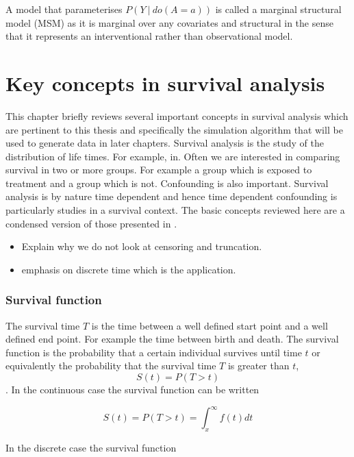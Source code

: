 \documentclass[11pt]{article}
\providecommand{\tightlist}{%
      \setlength{\itemsep}{0pt}\setlength{\parskip}{0pt}}
\begin{document}
    A model that parameterises \(P(Y\ |\ do(A=a))\) is called a marginal
structural model (MSM) as it is marginal over any covariates and
structural in the sense that it represents an interventional rather than
observational model.

    \newpage

    \section{Key concepts in survival
analysis}\label{key-concepts-in-survival-analysis}

This chapter briefly reviews several important concepts in survival
analysis which are pertinent to this thesis and specifically the
simulation algorithm that will be used to generate data in later
chapters. Survival analysis is the study of the distribution of life
times. For example, in. Often we are interested in comparing survival in
two or more groups. For example a group which is exposed to treatment
and a group which is not. Confounding is also important. Survival
analysis is by nature time dependent and hence time dependent
confounding is particularly studies in a survival context. The basic
concepts reviewed here are a condensed version of those presented in
\citet{JohnP.Klein2003}.

\begin{itemize}
\tightlist
\item
  Explain why we do not look at censoring and truncation.
\item
  emphasis on discrete time which is the application.
\end{itemize}

\subsubsection{Survival function}\label{survival-function}

The survival time \(T\) is the time between a well defined start point
and a well defined end point. For example the time between birth and
death. The survival function is the probability that a certain
individual survives until time \(t\) or equivalently the probability
that the survival time \(T\) is greater than \(t\), \[S(t) = P(T > t)\].
In the continuous case the survival function can be written

\[S(t) = P(T > t) = \int_{x}^{\infty}f(t)dt\]

In the discrete case the survival function
\end{document}

